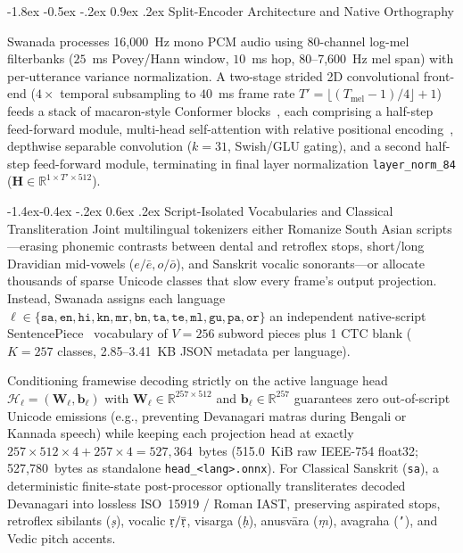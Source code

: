 \documentclass[10pt,twocolumn]{article}
\makeatletter
\renewcommand\section{\@startsection {section}{1}{\z@}%
  {-1.8ex \@plus -0.5ex \@minus -.2ex}%
  {0.9ex \@plus.2ex}%
  {\normalfont\large\bfseries}}
\renewcommand\subsection{\@startsection{subsection}{2}{\z@}%
  {-1.4ex\@plus -0.4ex \@minus -.2ex}%
  {0.6ex \@plus .2ex}%
  {\normalfont\normalsize\bfseries}}
\makeatother
\begin{document}
\section{Split-Encoder Architecture and Native Orthography}
\label{sec:arch}

Swanada processes 16,000~Hz mono PCM audio using 80-channel log-mel filterbanks ($25$~ms Povey/Hann window, $10$~ms hop, 80--7,600~Hz mel span) with per-utterance variance normalization. A two-stage strided 2D convolutional front-end ($4\times$ temporal subsampling to $40$~ms frame rate $T' = \lfloor(T_{\text{mel}} - 1)/4\rfloor + 1$) feeds a stack of macaron-style Conformer blocks~\cite{gulati2020conformer}, each comprising a half-step feed-forward module, multi-head self-attention with relative positional encoding~\cite{shaw2018self}, depthwise separable convolution ($k = 31$, Swish/GLU gating), and a second half-step feed-forward module, terminating in final layer normalization \texttt{layer\_norm\_84} ($\mathbf{H} \in \mathbb{R}^{1 \times T' \times 512}$).

\subsection{Script-Isolated Vocabularies and Classical Transliteration}
Joint multilingual tokenizers either Romanize South Asian scripts---erasing phonemic contrasts between dental and retroflex stops, short/long Dravidian mid-vowels ($e/\bar{e}, o/\bar{o}$), and Sanskrit vocalic sonorants---or allocate thousands of sparse Unicode classes that slow every frame's output projection. Instead, Swanada assigns each language $\ell \in \{\texttt{sa}, \texttt{en}, \texttt{hi}, \texttt{kn}, \texttt{mr}, \texttt{bn}, \texttt{ta}, \texttt{te}, \texttt{ml}, \texttt{gu}, \texttt{pa}, \texttt{or}\}$ an independent native-script SentencePiece~\cite{kudo2018sentencepiece} vocabulary of $V = 256$ subword pieces plus 1 CTC blank ($K = 257$ classes, 2.85--3.41~KB JSON metadata per language).

Conditioning framewise decoding strictly on the active language head $\mathcal{H}_\ell = (\mathbf{W}_\ell, \mathbf{b}_\ell)$ with $\mathbf{W}_\ell \in \mathbb{R}^{257 \times 512}$ and $\mathbf{b}_\ell \in \mathbb{R}^{257}$ guarantees zero out-of-script Unicode emissions (e.g., preventing Devanagari matras during Bengali or Kannada speech) while keeping each projection head at exactly $257 \times 512 \times 4 + 257 \times 4 = 527{,}364$~bytes (515.0~KiB raw IEEE-754 float32; 527,780~bytes as standalone \texttt{head\_<lang>.onnx}). For Classical Sanskrit (\texttt{sa}), a deterministic finite-state post-processor optionally transliterates decoded Devanagari into lossless ISO~15919 / Roman IAST, preserving aspirated stops, retroflex sibilants (\emph{\d{s}}), vocalic $\text{\d{r}}/\bar{\text{\d{r}}}$, visarga (\emph{\d{h}}), anusv\=ara (\emph{\d{m}}), avagraha (\texttt{'}), and Vedic pitch accents.
\end{document}
